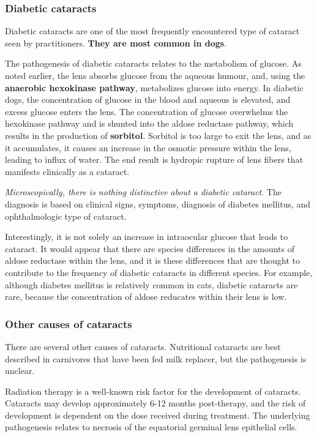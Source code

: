 \documentclass[
  openany]{article}
\begin{document}
\hypertarget{diabetic-cataracts}{%
\subsubsection{Diabetic cataracts}\label{diabetic-cataracts}}

Diabetic cataracts are one of the most frequently encountered type of cataract seen by practitioners. \textbf{They are most common in dogs}.

The pathogenesis of diabetic cataracts relates to the metabolism of glucose. As noted earlier, the lens absorbs glucose from the aqueous humour, and, using the \textbf{anaerobic hexokinase pathway}, metabolizes glucose into energy. In diabetic dogs, the concentration of glucose in the blood and aqueous is elevated, and excess glucose enters the lens. The concentration of glucose overwhelms the hexokinase pathway and is shunted into the aldose reductase pathway, which results in the production of \textbf{sorbitol}. Sorbitol is too large to exit the lens, and as it accumulates, it causes an increase in the osmotic pressure within the lens, leading to influx of water. The end result is hydropic rupture of lens fibers that manifests clinically as a cataract.

\emph{Microscopically, there is nothing distinctive about a diabetic cataract}. The diagnosis is based on clinical signs, symptoms, diagnosis of diabetes mellitus, and ophthalmologic type of cataract.

Interestingly, it is not solely an increase in intraocular glucose that leads to cataract. It would appear that there are species differences in the amounts of aldose reductase within the lens, and it is these differences that are thought to contribute to the frequency of diabetic cataracts in different species. For example, although diabetes mellitus is relatively common in cats, diabetic cataracts are rare, because the concentration of aldose reducates within their lens is low.

\hypertarget{other-causes-of-cataracts}{%
\subsubsection{Other causes of cataracts}\label{other-causes-of-cataracts}}

There are several other causes of cataracts. Nutritional cataracts are best described in carnivores that have been fed milk replacer, but the pathogenesis is unclear.

Radiation therapy is a well-known risk factor for the development of cataracts. Cataracts may develop approximately 6-12 months post-therapy, and the risk of development is dependent on the dose received during treatment. The underlying pathogenesis relates to necrosis of the equatorial germinal lens epithelial cells.
\end{document}
